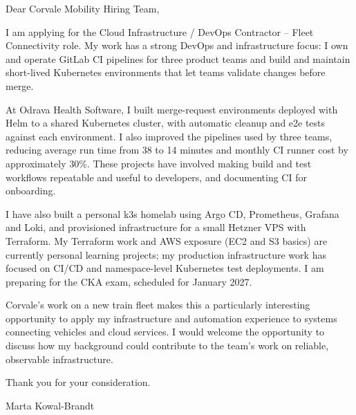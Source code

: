 \documentclass[11pt,a4paper]{article}
\begin{document}
\noindent Dear Corvale Mobility Hiring Team,\par
\vspace{1em}

I am applying for the Cloud Infrastructure / DevOps Contractor -- Fleet Connectivity role. My work has a strong DevOps and infrastructure focus: I own and operate GitLab CI pipelines for three product teams and build and maintain short-lived Kubernetes environments that let teams validate changes before merge.\par
\vspace{0.8em}

At Odrava Health Software, I built merge-request environments deployed with Helm to a shared Kubernetes cluster, with automatic cleanup and e2e tests against each environment. I also improved the pipelines used by three teams, reducing average run time from 38 to 14 minutes and monthly CI runner cost by approximately 30\%. These projects have involved making build and test workflows repeatable and useful to developers, and documenting CI for onboarding.\par
\vspace{0.8em}

I have also built a personal k3s homelab using Argo CD, Prometheus, Grafana and Loki, and provisioned infrastructure for a small Hetzner VPS with Terraform. My Terraform work and AWS exposure (EC2 and S3 basics) are currently personal learning projects; my production infrastructure work has focused on CI/CD and namespace-level Kubernetes test deployments. I am preparing for the CKA exam, scheduled for January 2027.\par
\vspace{0.8em}

Corvale’s work on a new train fleet makes this a particularly interesting opportunity to apply my infrastructure and automation experience to systems connecting vehicles and cloud services. I would welcome the opportunity to discuss how my background could contribute to the team’s work on reliable, observable infrastructure.\par
\vspace{0.8em}

Thank you for your consideration.\par
\vspace{1em}

Marta Kowal-Brandt
\end{document}
